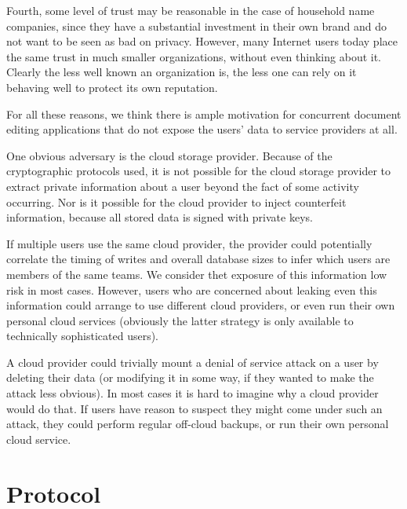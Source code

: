 \documentclass[pldi,10pt,preprint]{sigplanconf-pldi16}
\begin{document}
Fourth, some level of trust may be reasonable in the case of household name companies, since they have a substantial investment in their own brand and do not want to be seen as bad on privacy.
However, many Internet users today place the same trust in much smaller organizations, without even thinking about it.
Clearly the less well known an organization is, the less one can rely on it behaving well to protect its own reputation.

For all these reasons, we think there is ample motivation for concurrent document editing applications that do not expose the users' data to service providers at all.

One obvious adversary is the cloud storage provider.
Because of the cryptographic protocols used, it is not possible for the cloud storage provider to extract private information about a user beyond the fact of some activity occurring.
Nor is it possible for the cloud provider to inject counterfeit information, because all stored data is signed with private keys.

If multiple users use the same cloud provider, the provider could potentially correlate the timing of writes and overall database sizes to infer which users are members of the same teams.
We consider thet exposure of this information low risk in most cases.
However, users who are concerned about leaking even this information could arrange to use different cloud providers, or even run their own personal cloud services (obviously the latter strategy is only available to technically sophisticated users).

A cloud provider could trivially mount a denial of service attack on a user by deleting their data (or modifying it in some way, if they wanted to make the attack less obvious).
In most cases it is hard to imagine why a cloud provider would do that.
If users have reason to suspect they might come under such an attack, they could perform regular off-cloud backups, or run their own personal cloud service.

\section{Protocol}
\end{document}
